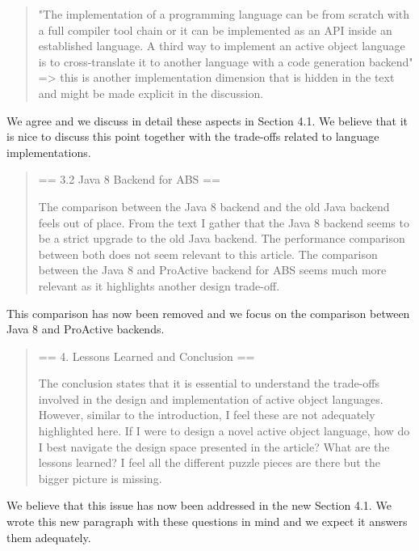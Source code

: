\documentclass{article}
\begin{document}

\begin{quote}
 "The implementation of a programming language can be from scratch with a full compiler 
tool chain or it can be implemented as an API inside an established language. A third way 
to implement an active object language is to cross-translate it to another language with 
a code generation backend" => this is another implementation dimension that is hidden in 
the text and might be made explicit in the discussion.
\end{quote}
We agree and we discuss in detail these aspects in  Section 4.1. We believe that it 
is nice to discuss this point together with the trade-offs related to language 
implementations.


\begin{quote}
	== 3.2 Java 8 Backend for ABS ==

The comparison between the Java 8 backend and the old Java backend feels out of place. 
From the text I gather that the Java 8 backend seems to be a strict upgrade to the old 
Java backend. The performance comparison between both does not seem relevant to this 
article.
The comparison between the Java 8 and ProActive backend for ABS seems much more relevant 
as it highlights another design trade-off.
\end{quote}
This comparison has now been removed and we focus on the comparison between Java 8 and 
ProActive backends.

\begin{quote}
	== 4. Lessons Learned and Conclusion ==

The conclusion states that it is essential to understand the trade-offs involved in the 
design and implementation of active object languages. However, similar to the 
introduction, I feel these are not adequately highlighted here. If I were to design a 
novel active object language, how do I best navigate the design space presented in the 
article? What are the lessons learned? I feel all the different puzzle pieces are there 
but the bigger picture is missing.
\end{quote}
We believe that this issue has now been addressed in the new Section 4.1. We wrote this 
new paragraph with these questions in mind and we expect it answers them adequately.
\end{document}
